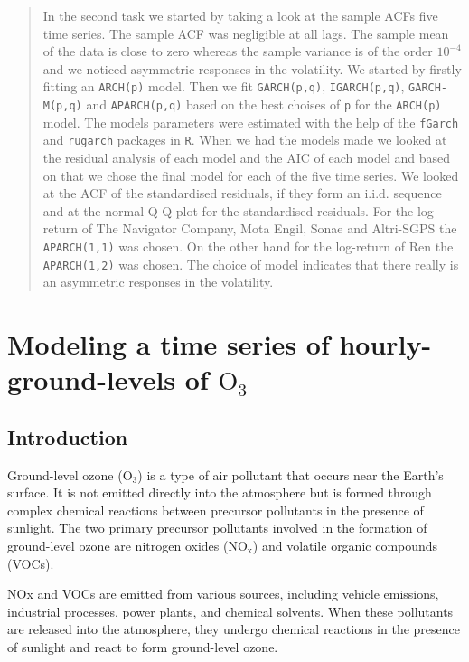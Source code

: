 \documentclass{article}
\begin{document}
\begin{abstract}
    In the second task we started by taking a look at the 
    sample ACFs five time series. The sample ACF was negligible at all lags.
    The sample mean of the data is close to zero whereas the sample
    variance is of the order $10^{-4}$ and we noticed asymmetric responses in the volatility.
    We started by firstly fitting an \verb|ARCH(p)| model. Then 
    we fit  \verb|GARCH(p,q)|,  \verb|IGARCH(p,q)|,  \verb|GARCH-M(p,q)|
    and  \verb|APARCH(p,q)| based on the best choises of \verb|p| for the 
    \verb|ARCH(p)| model. 
    The models parameters were 
    estimated with the help of the \verb|fGarch|
    and \verb|rugarch| packages in \verb|R|.
    When we had the models made we 
    looked at the residual analysis of each model and the AIC 
    of each model and based on that we chose the final model 
    for each of the five time series. 
    We looked at the ACF of the standardised residuals, if they 
    form an i.i.d. sequence and at the normal Q-Q plot for the standardised residuals.
    For the log-return of The Navigator Company, Mota Engil,
    Sonae and Altri-SGPS the  \verb|APARCH(1,1)| was chosen.
    On the other hand for the log-return of Ren
    the \verb|APARCH(1,2)| was chosen. The choice of model indicates 
    that there really is an asymmetric responses in the volatility.
\end{abstract}

\section{Modeling a time series of hourly-ground-levels of $\text{O}_3$}

\subsection{Introduction}

Ground-level ozone ($\text{O}_3$) is a type of air pollutant that occurs near the Earth's surface. It is not emitted directly into the atmosphere but is formed through complex chemical reactions between precursor pollutants in the presence of sunlight. The two primary precursor pollutants involved in the formation of ground-level ozone are nitrogen oxides ($\text{NO}_\text{x}$) and volatile organic compounds (VOCs).

NOx and VOCs are emitted from various sources, including vehicle emissions, industrial processes, power plants, and chemical solvents. When these pollutants are released into the atmosphere, they undergo chemical reactions in the presence of sunlight and react to form ground-level ozone.
\end{document}
